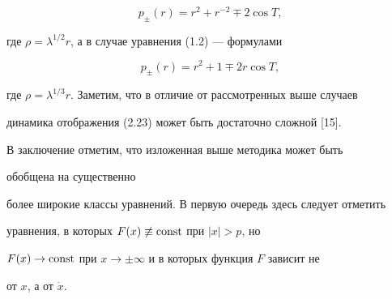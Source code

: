 $$


p_{\pm}(r)=r^2+r^{-2}\mp2\cos T,


$$


где $\rho=\lambda^{1/2}r$, а в случае уравнения (1.2) --- формулами


$$


p_{\pm}(r)=r^2+1\mp2r\cos T,


$$


где $\rho=\lambda^{1/3}r$. Заметим, что в отличие от рассмотренных выше случаев


динамика отображения (2.23) может быть достаточно сложной [15].





В заключение отметим, что изложенная выше методика может быть


обобщена на существенно


более широкие классы уравнений. В первую очередь здесь следует отметить


уравнения, в которых $F(x)\not\equiv\operatorname{const}$ при $|x|>p$, но


$F(x)\to\operatorname{const}$ при $x\to\pm\infty$ и в которых функция $F$ зависит не


от $x$, а от $\Dot x$.





